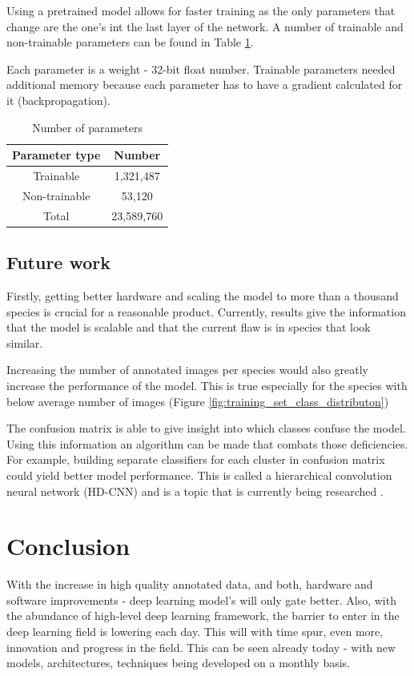 \documentclass[times, utf8, diplomski]{fer}
\begin{document}
Using a pretrained model allows for faster training as the only parameters that change are the one's int the last layer of the network. A number of trainable and non-trainable parameters can be found in Table \ref{tb:model_params}.

Each parameter is a weight - 32-bit float number. Trainable parameters needed additional memory because each parameter has to have a gradient calculated for it (backpropagation).

\begin{table}
\centering
\caption{Number of parameters}
\label{tb:model_params}
\begin{tabular}{cc}
\hline 
Parameter type & Number \\ \hline 
Trainable &   1,321,487\\ 
Non-trainable & 53,120 \\ 
Total & 23,589,760 \\
\hline 
\end{tabular} 
\end{table}

\section{Future work}
\label{se:future_work}

Firstly, getting better hardware and scaling the model to more than a thousand species is crucial for a reasonable product. Currently, results give the information that the model is scalable and that the current flaw is in species that look similar. 

Increasing the number of annotated images per species would also greatly increase the performance of the model. This is true especially for the species with below average number of images (Figure \ref{fig:training_set_class_distributon})

The confusion matrix is able to give insight into which classes confuse the model. Using this information an algorithm can be made that combats those deficiencies. For example, building separate classifiers for each cluster in confusion matrix could yield better model performance. This is called a hierarchical convolution neural network (HD-CNN) and is a topic that is currently being researched \citep{yan_hd-cnn:_2015, yan_hd-cnn:_2015-1}. 

\chapter{Conclusion}
With the increase in high quality annotated data, and both, hardware and software improvements - deep learning model's will only gate better. Also, with the abundance of high-level deep learning framework, the barrier to enter in the deep learning field is lowering each day. This will with time spur, even more, innovation and progress in the field. This can be seen already today - with new models, architectures, techniques being developed on a monthly basis.
\end{document}

